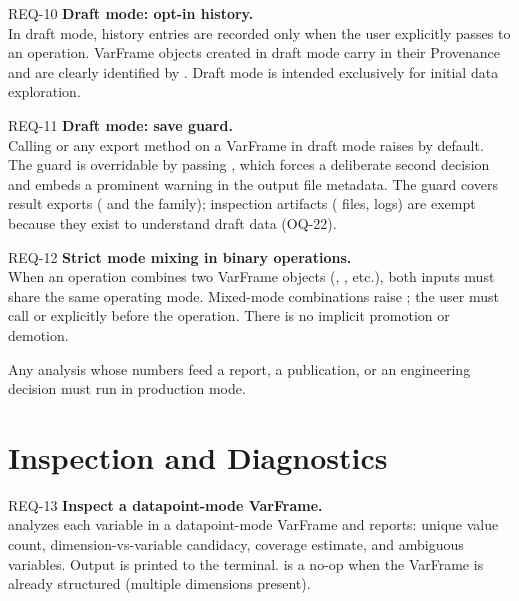 \begin{reqbox}{REQ-10}{\stable}
\textbf{Draft mode: opt-in history.}\\
In draft mode, history entries are recorded only when the user explicitly
passes  to an operation. VarFrame objects created in
draft mode carry  in their Provenance and are clearly
identified by . Draft mode is intended exclusively for
initial data exploration.
\end{reqbox}

\begin{reqbox}{REQ-11}{\stable}
\textbf{Draft mode: save guard.}\\
Calling  or any export method on a VarFrame in draft
mode raises  by default. The guard is
overridable by passing , which forces a deliberate
second decision and embeds a prominent warning in the output file
metadata. The guard covers result exports ( and the
 family); inspection artifacts ( files,
 logs) are exempt because they exist to
understand draft data (OQ-22).
\end{reqbox}

\begin{reqbox}{REQ-12}{\stable}
\textbf{Strict mode mixing in binary operations.}\\
When an operation combines two VarFrame objects (,
, etc.), both inputs must share the same operating
mode. Mixed-mode combinations raise ; the user
must call  or
 explicitly before the operation. There is
no implicit promotion or demotion.
\end{reqbox}

\begin{noteinfo}
Any analysis whose numbers feed a report, a publication, or an engineering
decision must run in production mode.
\end{noteinfo}

\section{Inspection and Diagnostics}

\begin{reqbox}{REQ-13}{\stable}
\textbf{Inspect a datapoint-mode VarFrame.}\\
 analyzes each variable in a datapoint-mode
VarFrame and reports: unique value count, dimension-vs-variable candidacy,
coverage estimate, and ambiguous variables. Output is printed to the
terminal.  is a no-op when the VarFrame is already
structured (multiple dimensions present).
\end{reqbox}

